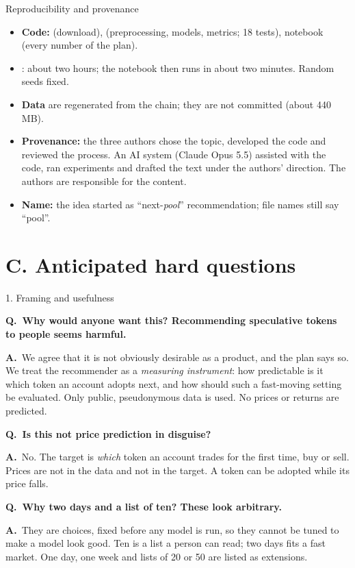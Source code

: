 \documentclass[aspectratio=169,10pt]{beamer}
\newcommand{\Q}[1]{\par{\color{orange}\bfseries Q.\ #1}\par\smallskip}
\newcommand{\A}{{\color{teal}\bfseries A.}\ }
\newcommand{\toindex}{\hfill\hyperlink{index}{\beamerreturnbutton{index}}}
\newcommand{\qsep}{\par\medskip{\color{grey!40}\hrule}\medskip}
\begin{document}
\begin{frame}[label=repro]{Reproducibility and provenance \toindex}
  \small
  \begin{itemize}
    \item \textbf{Code:}  (download),  (preprocessing, models, metrics; 18 tests), notebook  (every number of the plan).
    \item {}: about two hours; the notebook then runs in about two minutes. Random seeds fixed.
    \item \textbf{Data} are regenerated from the chain; they are not committed (about 440 MB).
    \item \textbf{Provenance:} the three authors chose the topic, developed the code and reviewed the process. An AI system (Claude Opus 5.5) assisted with the code, ran experiments and drafted the text under the authors' direction. The authors are responsible for the content.
    \item \textbf{Name:} the idea started as ``next-\emph{pool}'' recommendation; file names still say ``pool''.
  \end{itemize}
\end{frame}

\section{C. Anticipated hard questions}

\begin{frame}[label=qframe]{1. Framing and usefulness \toindex}
  \footnotesize
  \Q{Why would anyone want this? Recommending speculative tokens to people seems harmful.}
  \A We agree that it is not obviously desirable as a product, and the plan says so. We treat the recommender as a \emph{measuring instrument}: how predictable is it which token an account adopts next, and how should such a fast-moving setting be evaluated. Only public, pseudonymous data is used. No prices or returns are predicted.
  \qsep
  \Q{Is this not price prediction in disguise?}
  \A No. The target is \emph{which} token an account trades for the first time, buy or sell. Prices are not in the data and not in the target. A token can be adopted while its price falls.
  \qsep
  \Q{Why two days and a list of ten? These look arbitrary.}
  \A They are choices, fixed before any model is run, so they cannot be tuned to make a model look good. Ten is a list a person can read; two days fits a fast market. One day, one week and lists of 20 or 50 are listed as extensions.
\end{frame}
\end{document}

